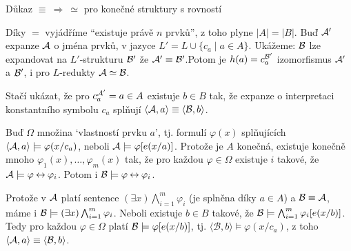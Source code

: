 \documentclass{beamer}
\begin{document}
\begin{frame}{Důkaz $\equiv\ \Rightarrow\ \simeq$ pro konečné struktury s rovností}
    
    \pause
    \vspace{-6pt}
    Díky $=$ vyjádříme ``existuje právě $n$ prvků'', z toho plyne \alert{$|A|=|B|$}. \pause 
    Buď $\mathcal{A}'$ expanze $\mathcal{A}$ o jména prvků, v jazyce $L'=L\cup\{c_a\mid a\in A\}$. Ukážeme: $\mathcal{B}$ \alert{lze expandovat} na $L'$-strukturu $\mathcal{B}'$ \alert{že $\mathcal{A}'\equiv \mathcal{B}'$}.\pause Potom je \alert{$h(a)= c_a^{\mathcal{B}'}$} izomorfismus $\mathcal{A}'$ a $\mathcal{B}'$, i pro $L$-redukty $\mathcal{A}\simeq\mathcal{B}$. \pause
    
    Stačí ukázat, že \alert{pro $c_a^{\mathcal{A}'}=a\in A$ existuje $b\in B$} tak, že expanze o interpretaci konstantního symbolu $c_a$ splňují \alert{$\langle \mathcal{A},a\rangle\equiv\langle\mathcal{B},b\rangle$}. \pause 
    
    Buď $\Omega$ množina `\alert{vlastností prvku $a$}', \pause tj. formulí $\varphi(x)$ splňujících $\langle \mathcal{A},a\rangle \models \varphi(x/c_a)$, neboli $\mathcal{A}\models \varphi[e(x/a)]$. \pause Protože je $A$ konečná, existuje \alert{konečně mnoho $\varphi_1(x),\dots,\varphi_m(x)$} tak, že pro každou $\varphi \in \Omega$ existuje $i$ takové, že $\mathcal{A}\models \varphi\mathbin{\leftrightarrow}\varphi_i$. \pause Potom i $\mathcal{B}\models\varphi\mathbin{\leftrightarrow}\varphi_i$. %
    
    \pause
    Protože v $\mathcal{A}$ platí sentence \alert{$(\exists x)\bigwedge_{i=1}^m\varphi_i$} (je splněna díky $a\in A$) a $\mathcal{B}\equiv\mathcal{A}$, máme i $\mathcal{B}\models (\exists x)\bigwedge_{i=1}^m\varphi_i$. \pause Neboli existuje $b\in B$ takové, že $\mathcal{B}\models \bigwedge_{i=1}^m\varphi_i[e(x/b)]$. \pause Tedy pro každou $\varphi\in \Omega$ platí $\mathcal{B}\models \varphi[e(x/b)]$, tj. $\langle\mathcal{B},b\rangle\models \varphi(x/c_a)$, z toho $\langle \mathcal{A},a\rangle\equiv\langle\mathcal{B},b\rangle$.\hfill\qedsymbol

\end{frame}
\end{document}

